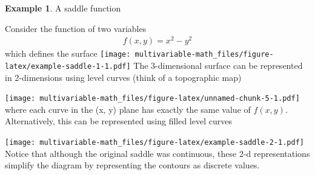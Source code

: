 \documentclass[
]{book}
\newenvironment{Shaded}{\begin{snugshade}}{\end{snugshade}}
\newcommand{\DataTypeTok}[1]{\textcolor[rgb]{0.13,0.29,0.53}{#1}}
\newcommand{\DecValTok}[1]{\textcolor[rgb]{0.00,0.00,0.81}{#1}}
\newcommand{\KeywordTok}[1]{\textcolor[rgb]{0.13,0.29,0.53}{\textbf{#1}}}
\newcommand{\NormalTok}[1]{#1}
\newcommand{\OperatorTok}[1]{\textcolor[rgb]{0.81,0.36,0.00}{\textbf{#1}}}
\newcommand{\StringTok}[1]{\textcolor[rgb]{0.31,0.60,0.02}{#1}}
\theoremstyle{definition}
\theoremstyle{definition}
\newtheorem{example}{Example}[chapter]
\theoremstyle{definition}
\theoremstyle{definition}
\theoremstyle{remark}
\begin{document}
\begin{example}
A saddle function

Consider the function of two variables
\[
\begin{aligned}
f(x, y) = x^2 - y^2
\end{aligned}
\]
which defines the surface
\texttt{[image: multivariable-math\_files/figure-latex/example-saddle-1-1.pdf]}
The 3-dimensional surface can be represented in 2-dimensions using level curves (think of a topographic map)

\begin{Shaded}
\end{Shaded}

\texttt{[image: multivariable-math\_files/figure-latex/unnamed-chunk-5-1.pdf]}
where each curve in the (x, y) plane has exactly the same value of \(f(x, y)\). Alternatively, this can be represented using filled level curves

\begin{Shaded}
\end{Shaded}

\texttt{[image: multivariable-math\_files/figure-latex/example-saddle-2-1.pdf]}
Notice that although the original saddle was continuous, these 2-d representations simplify the diagram by representing the contours as discrete values.
\end{example}
\end{document}
